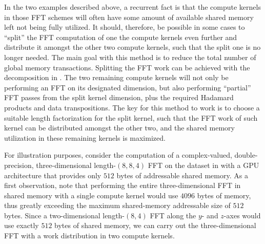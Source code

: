\documentclass[11pt, onecolumn, journal,compsoc]{IEEEtran}
\theoremstyle{problemstyle}
\begin{document}
In the two examples described above, a recurrent fact is that the compute kernels in those FFT schemes will often have some amount of available shared memory left not being fully utilized. It should, therefore, be possible in some cases to ``split'' the FFT computation of one the compute kernels even further and distribute it amongst the other two compute kernels, such that the split one is no longer needed. The main goal with this method is to reduce the total number of global memory transactions. Splitting the FFT work can be achieved with the decomposition in . The two remaining compute kernels will not only be performing an FFT on its designated dimension, but also performing ``partial'' FFT passes from the split kernel dimension, plus the required Hadamard products and data transpositions. The key for this method to work is to choose a suitable length factorization for the split kernel, such that the FFT work of such kernel can be distributed amongst the other two, and the shared memory utilization in these remaining kernels is maximized.

For illustration purposes, consider the computation of a complex-valued, double-precision, three-dimensional length-$(8,8,4)$ FFT on the dataset in  with a GPU architecture that provides only $512$ bytes of addressable shared memory. As a first observation, note that performing the entire three-dimensional FFT in shared memory with a single compute kernel would use $4096$ bytes of memory, thus greatly exceeding the maximum shared-memory addressable size of $512$ bytes. Since a two-dimensional length-$(8,4)$ FFT along the $y$- and $z$-axes would use exactly $512$ bytes of shared memory, we can carry out the three-dimensional FFT with a work distribution in two compute kernels. 
\end{document}
